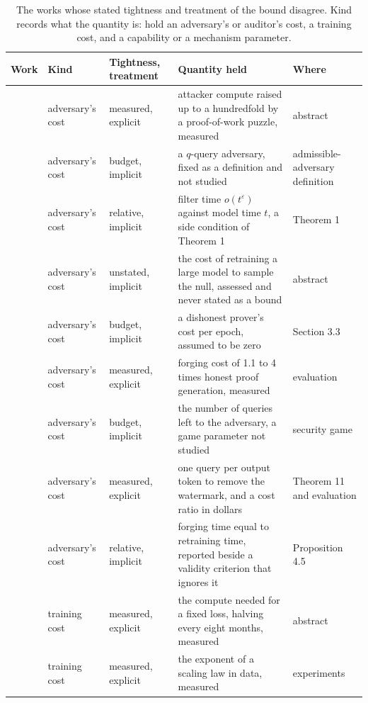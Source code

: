 \begin{table}[t]
\centering
\small
\caption{The \NearMiss{} works whose stated tightness and treatment of the bound disagree. Kind records what the quantity is: \NearMissAdv{} hold an adversary's or auditor's cost, \NearMissTrain{} a training cost, and \NearMissCap{} a capability or a mechanism parameter.}
\label{tab:nearmiss}
\begin{tabular}{@{}lp{3.2cm}p{2.4cm}p{6.6cm}p{2.7cm}@{}}
\toprule
Work & Kind & Tightness, treatment & Quantity held & Where \\
\midrule
\cite{DKLP22} & adversary's cost & measured, explicit & attacker compute raised up to a hundredfold by a proof-of-work puzzle, measured & abstract \\
\cite{NCM25} & adversary's cost & budget, implicit & a $q$-query adversary, fixed as a definition and not studied & admissible-adversary definition \\
\cite{BGGKRR26} & adversary's cost & relative, implicit & filter time $o(t^{\varepsilon})$ against model time $t$, a side condition of Theorem 1 & Theorem 1 \\
\cite{ZDKT25} & adversary's cost & unstated, implicit & the cost of retraining a large model to sample the null, assessed and never stated as a bound & abstract \\
\cite{ZFWCSXZ26} & adversary's cost & budget, implicit & a dishonest prover's cost per epoch, assumed to be zero & Section 3.3 \\
\cite{DJYWWMNL26} & adversary's cost & measured, explicit & forging cost of 1.1 to 4 times honest proof generation, measured & evaluation \\
\cite{FK24} & adversary's cost & budget, implicit & the number of queries left to the adversary, a game parameter not studied & security game \\
\cite{CGZ24} & adversary's cost & measured, explicit & one query per output token to remove the watermark, and a cost ratio in dollars & Theorem 11 and evaluation \\
\cite{ZCSL24} & adversary's cost & relative, implicit & forging time equal to retraining time, reported beside a validity criterion that ignores it & Proposition 4.5 \\
\midrule
\cite{HBEORGATS24} & training cost & measured, explicit & the compute needed for a fixed loss, halving every eight months, measured & abstract \\
\cite{SGSGM22} & training cost & measured, explicit & the exponent of a scaling law in data, measured & experiments \\

\end{tabular}
\end{table}
